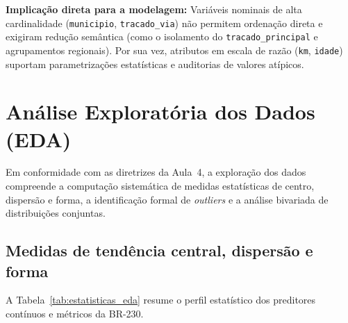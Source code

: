 \documentclass[11pt,a4paper]{article}
\begin{document}
\textbf{Implicação direta para a modelagem:} Variáveis nominais de alta cardinalidade (\texttt{municipio}, \texttt{tracado\_}\allowbreak\texttt{via}) não permitem ordenação direta e exigiram redução semântica (como o isolamento do \texttt{tracado\_}\allowbreak\texttt{principal} e agrupamentos regionais). Por sua vez, atributos em escala de razão (\texttt{km}, \texttt{idade}) suportam parametrizações estatísticas e auditorias de valores atípicos.

\section{Análise Exploratória dos Dados (EDA)}

Em conformidade com as diretrizes da Aula~4, a exploração dos dados compreende a computação sistemática de medidas estatísticas de centro, dispersão e forma, a identificação formal de \textit{outliers} e a análise bivariada de distribuições conjuntas.

\subsection{Medidas de tendência central, dispersão e forma}

A Tabela~\ref{tab:estatisticas_eda} resume o perfil estatístico dos preditores contínuos e métricos da BR-230.
\end{document}
